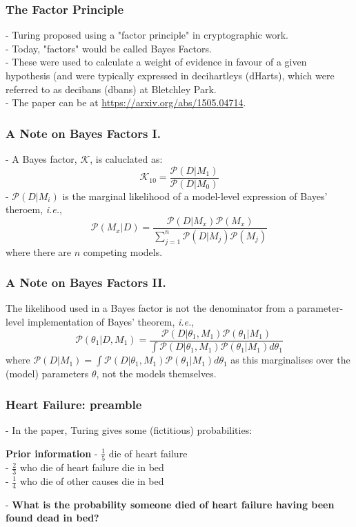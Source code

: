 \documentclass[•]{beamer}
\begin{document}
	\begin{frame}
		\frametitle{The Factor Principle}
		- Turing proposed using a "factor principle" in cryptographic work.\\
		- Today, "factors" would be called Bayes Factors.\\
		- These were used to calculate a weight of evidence in favour of a given hypothesis (and were typically expressed in decihartleys (dHarts), which were referred to as decibans (dbans) at Bletchley Park.\\
		- The paper can be at \url{https://arxiv.org/abs/1505.04714}.\\
	\end{frame}
	\begin{frame}
		\frametitle{A Note on Bayes Factors I.}
		- A Bayes factor, $\mathcal{K}$, is caluclated as:
		$$\mathcal{K}_{10} = \frac{\mathcal{P}(D | M_{1})}{\mathcal{P}(D | M_{0})}$$
		- $\mathcal{P}(D | M_{i})$ is the marginal likelihood of a model-level expression of Bayes' theroem, \textit{i.e.},
		$$\mathcal{P}(M_{x} | D) = \frac{\mathcal{P}(D | M_{x}) \mathcal{P}(M_{x})}{\sum\limits_{j=1}^{n} \mathcal{P}(D | M_{j}) \mathcal{P}(M_{j})}$$
		where there are $n$ competing models.
	\end{frame}
	\begin{frame}
		\frametitle{A Note on Bayes Factors II.}
		The likelihood used in a Bayes factor is not the denominator from a parameter-level implementation of Bayes' theorem, \textit{i.e.},
		$$\mathcal{P}(\theta_{1} | D, M_{1}) = \frac{\mathcal{P}(D | \theta_{1}, M_{1})\mathcal{P}(\theta_{1} | M_{1})}{\int \mathcal{P}(D | \theta_{1}, M_{1})\mathcal{P}(\theta_{1} | M_{1}) d \theta_{1}}$$
		where $\mathcal{P}(D | M_{1}) = \int \mathcal{P}(D | \theta_{1}, M_{1})\mathcal{P}(\theta_{1} | M_{1}) d \theta_{1}$ as this marginalises over the (model) parameters $\theta$, not the models themselves.\\
	\end{frame}
	\begin{frame}
		\frametitle{Heart Failure: preamble}
		- In the paper, Turing gives some (fictitious) probabilities:
		\begin{alertblock}{\textbf{Prior information}}
					- $\frac{1}{5}$ die of heart failure\\
					- $\frac{2}{3}$ who die of heart failure die in bed\\
		- $\frac{1}{4}$ who die of other causes die in bed\\
		\end{alertblock}
		- \textbf{What is the probability someone died of heart failure having been found dead in bed?}
	\end{frame}
\end{document}
